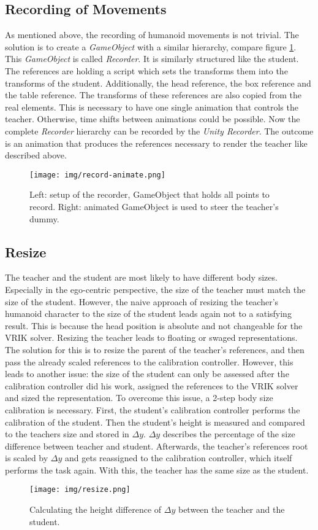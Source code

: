 \subsection{Recording of Movements}
As mentioned above, the recording of humanoid movements is not trivial. The solution is to create a \textit{GameObject} with a similar hierarchy, compare figure \ref{fig:record_animation}. This \textit{GameObject} is called \textit{Recorder}. It is similarly structured like the student. The references are holding a script which sets the transforms them into the transforms of the student. Additionally, the head reference, the box reference and the table reference. The transforms of these references are also copied from the real elements. This is necessary to have one single animation that controls the teacher. Otherwise, time shifts between animations could be possible. Now the complete \textit{Recorder} hierarchy can be recorded by the \textit{Unity Recorder}. The outcome is an animation that produces the references necessary to render the teacher like described above.
\begin{figure}
	\centering
	\texttt{[image: img/record-animate.png]}
	\caption{Left: setup of the recorder, GameObject that holds all points to record. Right: animated GameObject is used to steer the teacher's dummy.}
	\label{fig:record_animation}
\end{figure}
\subsection{Resize}
The teacher and the student are most likely to have different body sizes. Especially in the ego-centric perspective, the size of the teacher must match the size of the student. However, the naive approach of resizing the teacher's humanoid character to the size of the student leads again not to a satisfying result. This is because the head position is absolute and not changeable for the VRIK solver. Resizing the teacher leads to floating or swaged representations. The solution for this is to resize the parent of the teacher's references, and then pass the already scaled references to the calibration controller. However, this leads to another issue: the size of the student can only be assessed after the calibration controller did his work, assigned the references to the VRIK solver and sized the representation. To overcome this issue, a 2-step body size calibration is necessary. First, the student's calibration controller performs the calibration of the student. Then the student's height is measured and compared to the teachers size and stored in $\Delta y$. $\Delta y$ describes the percentage of the size difference between teacher and student. Afterwards, the teacher's references root is scaled by $\Delta y$ and gets reassigned to the calibration controller, which itself performs the task again. With this, the teacher has the same size as the student.
\begin{figure}
	\centering
	\texttt{[image: img/resize.png]}
	\caption{Calculating the height difference of $\Delta y$ between the teacher and the student.}
	\label{fig:resize}
\end{figure}

